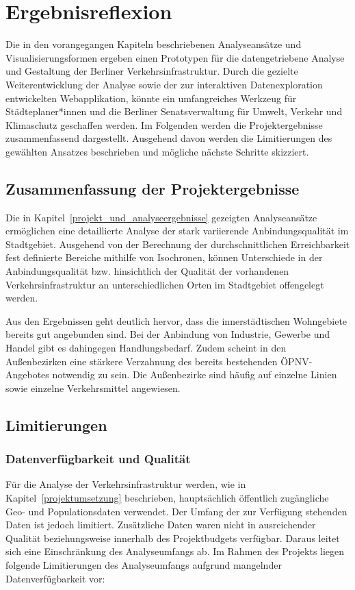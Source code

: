 \newpage


\section{Ergebnisreflexion}
\label{ergebnisreflexion}

Die in den vorangegangen Kapiteln beschriebenen Analyseansätze und Visualisierungsformen ergeben einen Prototypen für die datengetriebene Analyse und Gestaltung der Berliner Verkehrsinfrastruktur. Durch die gezielte Weiterentwicklung der Analyse sowie der zur interaktiven Datenexploration entwickelten Webapplikation, könnte ein umfangreiches Werkzeug für Städteplaner*innen und die Berliner Senatsverwaltung für Umwelt, Verkehr und Klimaschutz geschaffen werden. Im Folgenden werden die Projektergebnisse zusammenfassend dargestellt. Ausgehend davon werden die Limitierungen des gewählten Ansatzes beschrieben und mögliche nächste Schritte skizziert.

\subsection{Zusammenfassung der Projektergebnisse}
Die in Kapitel~\ref{projekt_und_analyseergebnisse} gezeigten Analyseansätze ermöglichen eine detaillierte Analyse der stark variierende Anbindungsqualität im Stadtgebiet. Ausgehend von der Berechnung der durchschnittlichen Erreichbarkeit fest definierte Bereiche mithilfe von Isochronen, können Unterschiede in der Anbindungsqualität bzw. hinsichtlich der Qualität der vorhandenen Verkehrsinfrastruktur an unterschiedlichen Orten im Stadtgebiet offengelegt werden.

Aus den Ergebnissen geht deutlich hervor, dass die innerstädtischen Wohngebiete bereits gut angebunden sind. Bei der Anbindung von Industrie, Gewerbe und Handel gibt es dahingegen Handlungsbedarf. Zudem scheint in den Außenbezirken eine stärkere Verzahnung des bereits bestehenden ÖPNV-Angebotes notwendig zu sein. Die Außenbezirke sind häufig auf einzelne Linien sowie einzelne Verkehrsmittel angewiesen.

\subsection{Limitierungen}\label{limitierung}

\subsubsection{Datenverfügbarkeit und Qualität}
Für die Analyse der Verkehrsinfrastruktur werden, wie in Kapitel~\ref{projektumsetzung} beschrieben, hauptsächlich öffentlich zugängliche Geo- und Populationsdaten verwendet. Der Umfang der zur Verfügung stehenden Daten ist jedoch limitiert. Zusätzliche Daten waren nicht in ausreichender Qualität beziehungsweise innerhalb des Projektbudgets verfügbar. Daraus leitet sich eine Einschränkung des Analyseumfangs ab. Im Rahmen des Projekts liegen folgende Limitierungen des Analyseumfangs aufgrund mangelnder Datenverfügbarkeit vor:

